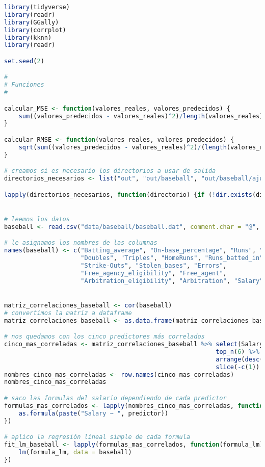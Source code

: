 \begin{lstlisting}[language=R]
library(tidyverse)
library(readr)
library(GGally)
library(corrplot)
library(kknn)
library(readr)

set.seed(2)

#
# Funciones
#

calcular_MSE <- function(valores_reales, valores_predecidos) {
	sum((valores_predecidos - valores_reales)^2)/length(valores_reales)
}

calcular_RMSE <- function(valores_reales, valores_predecidos) {
	sqrt(sum((valores_predecidos - valores_reales)^2)/(length(valores_reales)-2))
}

# creamos si es necesario los directorios a usar de salida
directorios_necesarios <- list("out", "out/baseball", "out/baseball/ajuste_lm")

lapply(directorios_necesarios, function(directorio) {if (!dir.exists(directorio)) dir.create(directorio) })


# leemos los datos
baseball <- read.csv("data/baseball/baseball.dat", comment.char = "@", header = FALSE)

# le asignamos los nombres de las columnas
names(baseball) <- c("Batting_average", "On-base_percentage", "Runs", "Hits",
					 "Doubles", "Triples", "HomeRuns", "Runs_batted_in", "Walks",
					 "Strike-Outs", "Stolen_bases", "Errors",
					 "Free_agency_eligibility", "Free_agent",
					 "Arbitration_eligibility", "Arbitration", "Salary")


matriz_correlaciones_baseball <- cor(baseball)
# convertimos la matriz a dataframe
matriz_correlaciones_baseball <- as.data.frame(matriz_correlaciones_baseball)

# nos quedamos con los cinco predictores más correlados
cinco_mas_correladas <- matriz_correlaciones_baseball %>% select(Salary) %>% # nos quedamos solo con la fila de salario
														  top_n(6) %>% # nos quedamos con las 6 mejores (son todas positivas)
														  arrange(desc(Salary)) %>% # las ordenamos por correlacion
														  slice(-c(1)) # eliminamos la primera fila (el propio salario)
nombres_cinco_mas_correladas <- row.names(cinco_mas_correladas)
nombres_cinco_mas_correladas

# saco las formulas del salario dependiendo de cada predictor
formulas_mas_correlados <- lapply(nombres_cinco_mas_correladas, function(predictor) {
	as.formula(paste("Salary ~ ", predictor))
})

# aplico la regresión lineal simple de cada formula
fit_lm_baseball <- lapply(formulas_mas_correlados, function(formula_lm) {
	lm(formula_lm, data = baseball)
})


\end{lstlisting}
